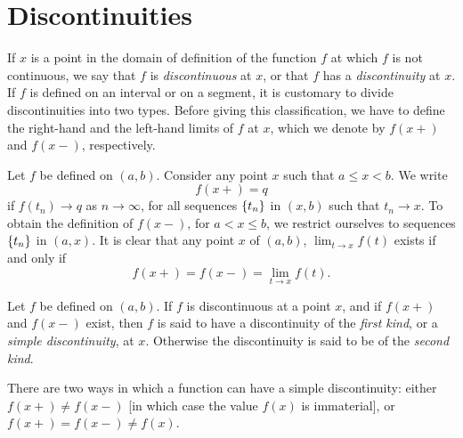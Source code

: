 \section{Discontinuities}

If $x$ is a point in the domain of definition of the function $f$ at which $f$ is not continuous, 
we say that $f$ is \emph{discontinuous} at $x$, 
or that $f$ has a \emph{discontinuity} at $x$.
If $f$ is defined on an interval or on a segment, 
it is customary to divide discontinuities into two types. 
Before giving this classification, 
we have to define the right-hand and the left-hand limits of $f$ at $x$, 
which we denote by $f(x+)$ and $f(x-)$, respectively.

\begin{myDef}
    \label{myDef:4.25}
    Let $f$ be defined on $(a, b)$. 
    Consider any point $x$ such that $a \leq x < b$. 
    We write
    \begin{equation*}
        f(x+) = q        
    \end{equation*}
    if $f(t_n) \rightarrow q$ as $n \rightarrow \infty$, 
    for all sequences $\protect\{t_n\}$ in $(x, b)$ such that $t_n \rightarrow x$. 
    To obtain the definition of $f(x-)$, 
    for $a < x \leq b$, 
    we restrict ourselves to sequences $\protect\{t_n\}$ in $(a, x)$.
    It is clear that any point $x$ of $(a, b)$, 
    $\lim_{t \to x} f(t)$ exists if and only if
    \begin{equation*}
        f(x+) = f(x-) = \lim_{t \to x} f(t).
    \end{equation*}
\end{myDef}

\begin{myDef}
    \label{myDef:4.26}
    Let $f$ be defined on $(a, b)$. 
    If $f$ is discontinuous at a point $x$,
    and if $f(x +)$ and $f (x-)$ exist, 
    then $f$ is said to have a discontinuity of the \emph{first kind}, 
    or a \emph{simple discontinuity}, at $x$. 
    Otherwise the discontinuity is said to be of the \emph{second kind}.

    There are two ways in which a function can have a simple discontinuity:
    either $f(x+) \neq f(x-)$ [in which case the value $f(x)$ is immaterial], 
    or $f(x+) = f(x-) \neq f(x)$.
\end{myDef}

